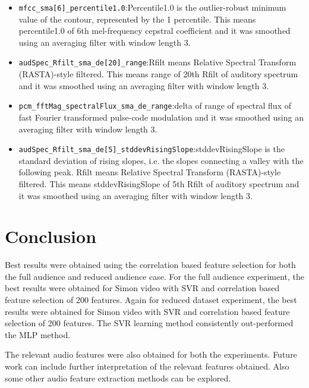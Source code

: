 \begin{itemize}
\item \verb|mfcc_sma[6]_percentile1.0|:Percentile1.0 is the outlier-robust minimum value of the contour, represented by the 1 percentile. This means percentile1.0 of 6th mel-frequency cepstral coefficient and it was smoothed using an averaging filter with window length 3.
\item \verb|audSpec_Rfilt_sma_de[20]_range|:Rfilt means Relative Spectral Transform (RASTA)-style filtered. This means range of 20th Rfilt of auditory spectrum and it was smoothed using an averaging filter with window length 3.
\item \verb|pcm_fftMag_spectralFlux_sma_de_range|:delta of range of spectral flux of fast Fourier transformed pulse-code modulation and it was smoothed using an averaging filter with window length 3.
\item \verb|audSpec_Rfilt_sma_de[5]_stddevRisingSlope|:stddevRisingSlope is the standard deviation of rising slopes, i.e. the slopes connecting a valley with the following peak. Rfilt means Relative Spectral Transform (RASTA)-style filtered. This means stddevRisingSlope of 5th Rfilt of auditory spectrum and it was smoothed using an averaging filter with window length 3.
\end{itemize}

\section{Conclusion}

Best results were obtained using the correlation based feature selection for both the full audience and reduced audience case. For the full audience experiment, the best results were obtained for Simon video with SVR and correlation based feature selection of 200 features. Again for reduced dataset experiment, the best results were obtained for Simon video with SVR and correlation based feature selection of 200 features. The SVR learning method consistently out-performed the MLP method. 

The relevant audio features were also obtained for both the experiments. Future work can include further interpretation of the relevant features obtained. Also some other audio feature extraction methods can be explored. 


